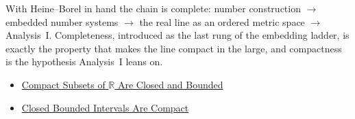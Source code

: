 \begin{remark*}[Exposition]
With Heine--Borel in hand the chain is complete: number construction $\to$ embedded number systems $\to$ the real line as an ordered metric space $\to$ Analysis~I. Completeness, introduced as the last rung of the embedding ladder, is exactly the property that makes the line compact in the large, and compactness is the hypothesis Analysis~I leans on.
\end{remark*}
\begin{dependencies}
\begin{itemize}
  \item \hyperref[thm:compact-implies-closed-bounded]{Compact Subsets of $\mathbb{R}$ Are Closed and Bounded}
  \item \hyperref[thm:closed-bounded-interval-compact]{Closed Bounded Intervals Are Compact}
\end{itemize}
\end{dependencies}
